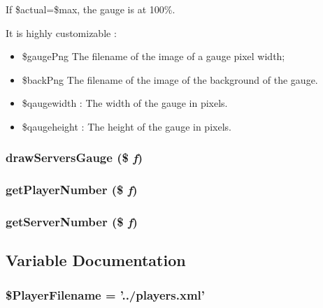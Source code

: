If \$actual=\$max, the gauge is at 100\%.

It is highly customizable :\begin{itemize}
\item \$gauge\-Png The filename of the image of a gauge pixel width;\item \$back\-Png The filename of the image of the background of the gauge.\item \$qaugewidth : The width of the gauge in pixels.\item \$qaugeheight : The height of the gauge in pixels. \end{itemize}
\subsubsection{\setlength{\rightskip}{0pt plus 5cm}draw\-Servers\-Gauge (\$ {\em f})}\label{gamestate_8php_eca06d838ec19ca9edf49b73cfc2075b}


\subsubsection{\setlength{\rightskip}{0pt plus 5cm}get\-Player\-Number (\$ {\em f})}\label{gamestate_8php_91cd89972d777a952ae020619395623f}


\subsubsection{\setlength{\rightskip}{0pt plus 5cm}get\-Server\-Number (\$ {\em f})}\label{gamestate_8php_7521705d46e073eb0e99aaa0cce0d9f5}




\subsection{Variable Documentation}
\subsubsection{\setlength{\rightskip}{0pt plus 5cm}\$Player\-Filename = '../players.xml'}\label{gamestate_8php_9c4bd163d27e0af984e9673e4be8b068}


